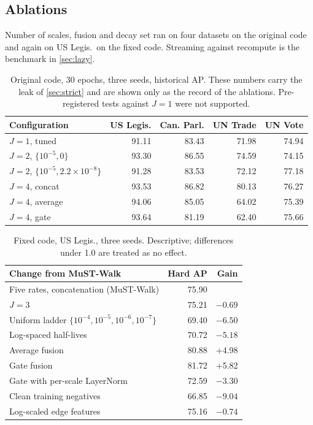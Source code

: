 \documentclass[11pt,a4paper]{article}
\theoremstyle{remark}
\begin{document}
\subsection{Ablations}
Number of scales, fusion and decay set ran on four datasets on the original code and again on US Legis.\ on the fixed code. Streaming against recompute is the benchmark in \cref{sec:lazy}.
\begin{table}[h]\centering\small
\begin{tabular}{lrrrr}
\toprule
Configuration & US Legis. & Can. Parl. & UN Trade & UN Vote\\
\midrule
$J=1$, tuned & 91.11 & 83.43 & 71.98 & 74.94\\
$J=2$, $\{10^{-5},0\}$ & 93.30 & 86.55 & 74.59 & 74.15\\
$J=2$, $\{10^{-5},2.2\times10^{-8}\}$ & 91.28 & 83.53 & 72.12 & 77.18\\
$J=4$, concat & 93.53 & 86.82 & 80.13 & 76.27\\
$J=4$, average & 94.06 & 85.05 & 64.02 & 75.39\\
$J=4$, gate & 93.64 & 81.19 & 62.40 & 75.66\\
\bottomrule
\end{tabular}
\caption{Original code, 30 epochs, three seeds, historical AP. These numbers carry the leak of \cref{sec:strict} and are shown only as the record of the ablations. Pre-registered tests against $J=1$ were not supported.}\label{tab:oldabl}
\end{table}

\begin{table}[h]\centering\small
\begin{tabular}{p{7.2cm}rr}
\toprule
Change from MuST-Walk & Hard AP & Gain\\
\midrule
Five rates, concatenation (MuST-Walk) & 75.90 & \\
$J=3$ & 75.21 & $-0.69$\\
Uniform ladder $\{10^{-4},10^{-5},10^{-6},10^{-7}\}$ & 69.40 & $-6.50$\\
Log-spaced half-lives & 70.72 & $-5.18$\\
Average fusion & 80.88 & +4.98\\
Gate fusion & 81.72 & +5.82\\
Gate with per-scale LayerNorm & 72.59 & $-3.30$\\
Clean training negatives & 66.85 & $-9.04$\\
Log-scaled edge features & 75.16 & $-0.74$\\
\bottomrule
\end{tabular}
\caption{Fixed code, US Legis., three seeds. Descriptive; differences under 1.0 are treated as no effect.}\label{tab:abl}
\end{table}
\end{document}
